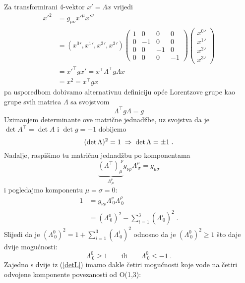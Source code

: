 Za transformirani 4-vektor $x' = \Lambda x$ vrijedi
\begin{align}
 {x'}^2 &= g_{\mu\nu} {x'}^\mu {x'}^\nu \\
        &= ({x^0}', {x^1}', {x^2}', {x^3}')
\begin{pmatrix}
1 & 0 & 0 & 0 \\
0 &-1 & 0 & 0 \\
0 & 0 &-1 & 0 \\
0 & 0 & 0 &-1
\end{pmatrix}
\begin{pmatrix}
{x^0}' \\ {x^1}' \\ {x^2}' \\ {x^3}'
\end{pmatrix} \\
  &= {x'}^{\top} g x' = x^\top \Lambda^\top g \Lambda x \\
  &= x^2 = x^\top g x
\end{align}
pa usporedbom dobivamo alternativnu definiciju opće Lorentzove grupe
kao grupe svih matrica $\Lambda$ sa svojstvom
\begin{equation}
   \Lambda^\top g \Lambda = g
\label{deflambda}
\end{equation}
Uzimanjem determinante ove matrične jednadžbe, uz svojstva
da je $\det A^\top = \det A$ i $\det g = -1$ dobijemo 
\begin{equation}
   (\det \Lambda)^2 = 1 \;\Rightarrow\;  \det\Lambda = \pm 1 \;.
\label{detL}
\end{equation}
Nadalje, raspišimo tu matričnu jednadžbu po komponentama
\begin{equation}
 \underbrace{(\Lambda^\top)_{\mu}^{\;\nu}}_{\Lambda^{\nu}_{\:\mu}}
g_{\nu\rho}\Lambda^{\rho}_{\:\sigma} = g_{\mu\sigma}
\end{equation}
i pogledajmo komponentu $\mu=\sigma=0$:
\begin{align}
1 &= g_{\nu\rho} \Lambda^{\nu}_{\:0} \Lambda^{\rho}_{\:0}  \\
  &= (\Lambda^{0}_{\:0})^2 - \sum_{i=1}^{3}(\Lambda^{i}_{\:0})^2 \;.
\end{align}
Slijedi da je $(\Lambda^{0}_{\:0})^2 = 1 + \sum_{i=1}^{3}(\Lambda^{i}_{\:0})^2$
odnosno da je $(\Lambda^{0}_{\:0})^2 \geq 1$ što daje dvije mogućnosti:
\begin{equation}
    \Lambda^{0}_{\:0}\geq 1  \qquad\text{ili}\qquad \Lambda^{0}_{\:0}\leq -1 \;.
\end{equation}
Zajedno s dvije iz (\ref{detL}) imamo dakle četiri mogućnosti koje vode
na četiri odvojene komponente povezanosti od O(1,3): \\

